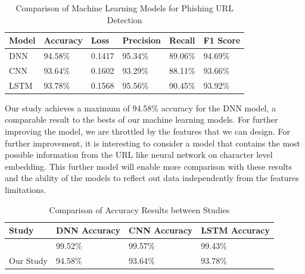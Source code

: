 \documentclass{article}
\begin{document}
    \begin{table}[H]
        \centering
        \begin{tabular}{|l|l|l|l|l|l|}
            \hline
            \textbf{Model} & \textbf{Accuracy} & \textbf{Loss} & \textbf{Precision} & \textbf{Recall} & \textbf{F1 Score} \\ \hline
            DNN            & 94.58\%           & 0.1417        & 95.34\%            & 89.06\%         & 94.69\%           \\ \hline
            CNN            & 93.64\%           & 0.1602        & 93.29\%            & 88.11\%         & 93.66\%           \\ \hline
            LSTM           & 93.78\%           & 0.1568        & 95.56\%            & 90.45\%         & 93.92\%           \\ \hline
        \end{tabular}
        \caption{Comparison of Machine Learning Models for Phishing URL Detection}
        \label{tab:feature_vector_nn_model_comparison}
    \end{table}

    Our study achieves a maximum of 94.58\% accuracy for the DNN model, a comparable result to the bests of our machine learning models.
    For further improving the model, we are throttled by the features that we can design.
    For further improvement, it is interesting to consider a model that contains the most possible information from the URL like neural network on character level embedding.
    This further model will enable more comparison with these results and the ability of the models to reflect out data independently from the features limitations.

    \begin{table}[H]
        \centering
        \begin{tabular}{|l|l|l|l|}
            \hline
            \textbf{Study}                                & \textbf{DNN Accuracy} & \textbf{CNN Accuracy} & \textbf{LSTM Accuracy} \\ \hline
            \cite{EfficientDeepLearningPhishingDetection} & 99.52\%               & 99.57\%               & 99.43\%                \\ \hline
            Our Study                                     & 94.58\%               & 93.64\%               & 93.78\%                \\ \hline
        \end{tabular}
        \caption{Comparison of Accuracy Results between Studies}
        \label{tab:accuracy_comparison}
    \end{table}
\end{document}

